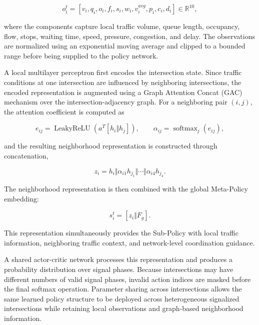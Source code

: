 \documentclass[3p,times]{elsarticle}
\theoremstyle{plain}
\theoremstyle{definition}
\begin{document}
\begin{equation}
o_i^t = \left[v_i, q_i, o_i, f_i, s_i, w_i, v_i^{avg}, p_i, c_i,
d_i\right] \in \mathbb{R}^{10},
\end{equation}

where the components capture local traffic volume, queue length,
occupancy, flow, stops, waiting time, speed, pressure, congestion, and
delay. The observations are normalized using an exponential moving
average and clipped to a bounded range before being supplied to the
policy network.

A local multilayer perceptron first encodes the intersection state.
Since traffic conditions at one intersection are influenced by
neighboring intersections, the encoded representation is augmented
using a Graph Attention Concat (GAC) mechanism over the
intersection-adjacency graph. For a neighboring pair $(i, j)$, the
attention coefficient is computed as

\begin{equation}
e_{ij} = \operatorname{LeakyReLU}\!\left(a^{T}[h_i \Vert h_j]\right),
\qquad
\alpha_{ij} = \operatorname{softmax}_j(e_{ij}),
\end{equation}

and the resulting neighborhood representation is constructed through
concatenation,

\begin{equation}
z_i = h_i \Vert \alpha_{i1}h_{j_1} \Vert \cdots \Vert
\alpha_{i4}h_{j_4}.
\end{equation}

The neighborhood representation is then combined with the global
Meta-Policy embedding:

\begin{equation}
s_i^t = \left[z_i \Vert F_g\right].
\end{equation}

This representation simultaneously provides the Sub-Policy with
local traffic information, neighboring traffic context, and
network-level coordination guidance.

A shared actor-critic network processes this representation and
produces a probability distribution over signal phases. Because
intersections may have different numbers of valid signal phases,
invalid action indices are masked before the final softmax operation.
Parameter sharing across intersections allows the same learned policy
structure to be deployed across heterogeneous signalized intersections
while retaining local observations and graph-based neighborhood
information.
\end{document}
